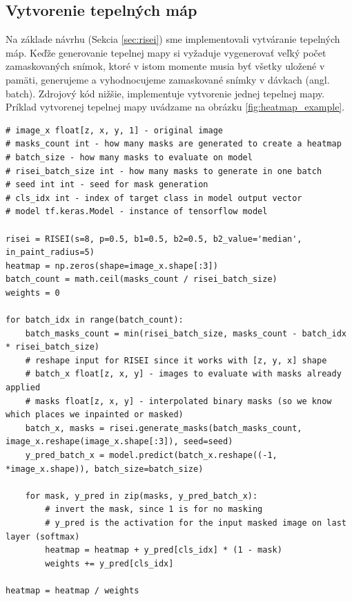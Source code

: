 \subsection{Vytvorenie tepelných máp}

Na základe návrhu (Sekcia \ref{sec:risei}) sme implementovali vytváranie tepelných máp. Keďže generovanie tepelnej mapy si vyžaduje vygenerovať veľký počet zamaskovaných snímok, ktoré v istom momente musia byť všetky uložené v pamäti, generujeme a vyhodnocujeme zamaskované snímky v dávkach (angl. batch). Zdrojový kód nižšie, implementuje vytvorenie jednej tepelnej mapy. Príklad vytvorenej tepelnej mapy uvádzame na obrázku \ref{fig:heatmap_example}.

\begin{lstlisting}
# image_x float[z, x, y, 1] - original image
# masks_count int - how many masks are generated to create a heatmap
# batch_size - how many masks to evaluate on model
# risei_batch_size int - how many masks to generate in one batch
# seed int int - seed for mask generation
# cls_idx int - index of target class in model output vector
# model tf.keras.Model - instance of tensorflow model

risei = RISEI(s=8, p=0.5, b1=0.5, b2=0.5, b2_value='median', in_paint_radius=5)
heatmap = np.zeros(shape=image_x.shape[:3])
batch_count = math.ceil(masks_count / risei_batch_size)
weights = 0

for batch_idx in range(batch_count):
    batch_masks_count = min(risei_batch_size, masks_count - batch_idx * risei_batch_size)
    # reshape input for RISEI since it works with [z, y, x] shape
    # batch_x float[z, x, y] - images to evaluate with masks already applied
    # masks float[z, x, y] - interpolated binary masks (so we know which places we inpainted or masked)
    batch_x, masks = risei.generate_masks(batch_masks_count, image_x.reshape(image_x.shape[:3]), seed=seed)
    y_pred_batch_x = model.predict(batch_x.reshape((-1, *image_x.shape)), batch_size=batch_size)

    for mask, y_pred in zip(masks, y_pred_batch_x):
        # invert the mask, since 1 is for no masking
        # y_pred is the activation for the input masked image on last layer (softmax)
        heatmap = heatmap + y_pred[cls_idx] * (1 - mask)
        weights += y_pred[cls_idx]

heatmap = heatmap / weights
\end{lstlisting}

